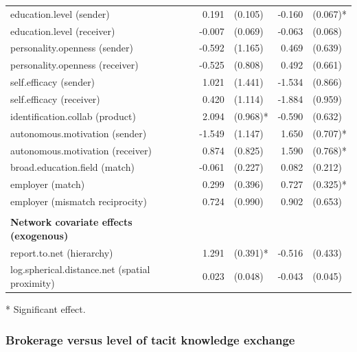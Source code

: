 \begin{table}[]
\begin{threeparttable}
\begin{tabular}{@{}lrlrl@{}}
			education.level (sender)                        & 0.191   	& (0.105)  	& -0.160  	& (0.067)*  \\
			education.level (receiver)                      & -0.007  	& (0.069)  	& -0.063  	& (0.068) 	\\
			personality.openness (sender)                   & -0.592  	& (1.165)  	& 0.469 	& (0.639) 	\\
			personality.openness (receiver)                 & -0.525  	& (0.808)  	& 0.492 	& (0.661) 	\\
			self.efficacy (sender)                          & 1.021   	& (1.441)  	& -1.534  	& (0.866) 	\\
			self.efficacy (receiver)                        & 0.420   	& (1.114)  	& -1.884  	& (0.959) 	\\
			identification.collab (product)                 & 2.094   	& (0.968)* 	& -0.590  	& (0.632) 	\\
			autonomous.motivation (sender)                  & -1.549  	& (1.147)  	& 1.650 	& (0.707)*  \\
			autonomous.motivation (receiver)                & 0.874   	& (0.825)  	& 1.590 	& (0.768)*  \\
			broad.education.field (match)                   & -0.061  	& (0.227)  	& 0.082 	& (0.212) 	\\
			employer (match) 								& 0.299   	& (0.396)  	& 0.727 	& (0.325)*  \\
			employer (mismatch reciprocity)                 & 0.724   	& (0.990)   & 0.902 	& (0.653) 	\\
															&         	&          	&       	&         	\\
			\textbf{Network covariate effects (exogenous)}  &         	&          	&       	&         	\\
			report.to.net (hierarchy)                       & 1.291   	& (0.391)*	& -0.516  	& (0.433) 	\\
			log.spherical.distance.net (spatial proximity)  & 0.023   	& (0.048)  	& -0.043  	& (0.045) 	\\ \bottomrule
		\end{tabular}
		\begin{tablenotes}
			\small
			\item [*] Significant effect.
		\end{tablenotes}
	\end{threeparttable}
\end{table}

\subsubsection{Brokerage versus level of tacit knowledge exchange}

